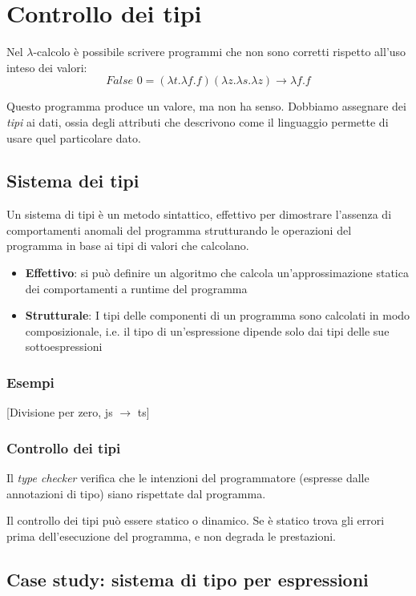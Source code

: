 \documentclass[a4paper,10pt]{article}
\begin{document}
\section{Controllo dei tipi}
Nel $\lambda$-calcolo è possibile scrivere programmi che non sono corretti rispetto all'uso inteso dei valori:
\[ False \,\,0 = (\lambda t.\lambda f.f)(\lambda z.\lambda s.\lambda z) \to \lambda f.f\]

Questo programma produce un valore, ma non ha senso. Dobbiamo assegnare dei \emph{tipi} ai dati, ossia degli attributi che descrivono come il linguaggio permette di usare quel particolare dato.

\subsection{Sistema dei tipi}
Un sistema di tipi è un metodo sintattico, effettivo per dimostrare l'assenza di comportamenti anomali del programma strutturando le operazioni del programma in base ai tipi di valori che calcolano.
\begin{itemize}
 \item \textbf{Effettivo}: si può definire un algoritmo che calcola un'approssimazione statica dei comportamenti a runtime del programma
 \item \textbf{Strutturale}: I tipi delle componenti di un programma sono calcolati in modo composizionale, i.e. il tipo di un'espressione dipende solo dai tipi delle sue sottoespressioni
\end{itemize}

\subsubsection{Esempi}
[Divisione per zero, js $\to$ ts]
\subsubsection{Controllo dei tipi}
Il \emph{type checker} verifica che le intenzioni del programmatore (espresse dalle annotazioni di tipo) siano rispettate dal programma.\smallskip

Il controllo dei tipi può essere statico o dinamico. Se è statico trova gli errori prima dell'esecuzione del programma, e non degrada le prestazioni.

\subsection{Case study: sistema di tipo per espressioni}
\end{document}
